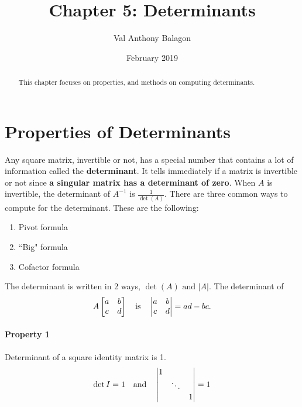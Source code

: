 \documentclass[12pt, letterpaper]{article}
\author{Val Anthony Balagon}
\date{February 2019}
\title{Chapter 5: Determinants}
\newcommand{\DefinitionSpace}{\vspace{15px}}
\theoremstyle{definition}
\begin{document}
	\maketitle
	\begin{abstract}
		This chapter focuses on properties, and methods on computing determinants.
	\end{abstract}

\section{Properties of Determinants}
	Any square matrix, invertible or not, has a special number that contains a lot of information called the \textbf{determinant}. It tells immediately if a matrix is invertible or not since \textbf{a singular matrix has a determinant of zero}. When $A$ is invertible, the determinant of $A^{-1}$ is $\frac{1}{\det(A)}$. There are three common ways to compute for the determinant. These are the following:
	
		{\centering
			\begin{enumerate}
				\item Pivot formula
				\item ``Big" formula
				\item Cofactor formula
		\end{enumerate}}
	
	\noindent The determinant is written in 2 ways, $\det(A) \text{ and } |A|$. The determinant of \[A \begin{bmatrix} a & b \\ c & d \end{bmatrix} \text{\quad is\quad} \begin{vmatrix}a & b \\ c & d\end{vmatrix} = ad - bc.\]
	
\paragraph{Property 1}
Determinant of a square identity matrix is 1.
	\[\det{I} = 1 \text{\quad and\quad} \begin{vmatrix}
									1   &   & \\
									& \ddots& \\
									&       & 1 
								\end{vmatrix} = 1\]

\DefinitionSpace
\end{document}
